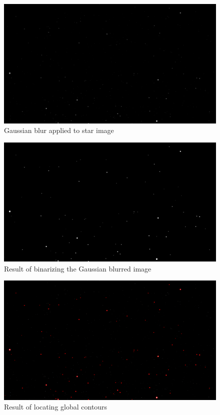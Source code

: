 \documentclass[10pt,twocolumn,letterpaper]{article}
\begin{document}
\begin{figure}[h]
  \centering
   \includegraphics[width=0.9\linewidth]{gauss}
   \caption{Gaussian blur applied to star image}
   \label{fig:star_gauss}
\end{figure}

\begin{figure}[h]
  \centering
   \includegraphics[width=0.9\linewidth]{binary}
   \caption{Result of binarizing the Gaussian blurred image}
   \label{fig:star_binary}
\end{figure}

\begin{figure}[h]
  \centering
   \includegraphics[width=0.9\linewidth]{all_contours}
   \caption{Result of locating global contours}
   \label{fig:star_contours}
\end{figure}
\end{document}
